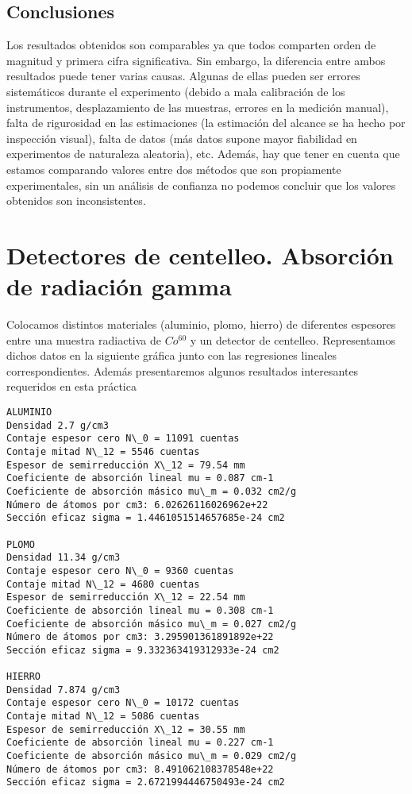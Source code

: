 \documentclass[11pt]{article}
\begin{document}
    

    \hypertarget{conclusiones}{%
\subsection{Conclusiones}\label{conclusiones}}

Los resultados obtenidos son comparables ya que todos comparten orden de
magnitud y primera cifra significativa. Sin embargo, la diferencia entre
ambos resultados puede tener varias causas. Algunas de ellas pueden ser
errores sistemáticos durante el experimento (debido a mala calibración
de los instrumentos, desplazamiento de las muestras, errores en la
medición manual), falta de rigurosidad en las estimaciones (la
estimación del alcance se ha hecho por inspección visual), falta de
datos (más datos supone mayor fiabilidad en experimentos de naturaleza
aleatoria), etc. Además, hay que tener en cuenta que estamos comparando
valores entre dos métodos que son propiamente experimentales, sin un
análisis de confianza no podemos concluir que los valores obtenidos son
inconsistentes.

    \hypertarget{detectores-de-centelleo.-absorciuxf3n-de-radiaciuxf3n-gamma}{%
\section{Detectores de centelleo. Absorción de radiación
gamma}\label{detectores-de-centelleo.-absorciuxf3n-de-radiaciuxf3n-gamma}}

Colocamos distintos materiales (aluminio, plomo, hierro) de diferentes
espesores entre una muestra radiactiva de \(Co^{60}\) y un detector de
centelleo. Representamos dichos datos en la siguiente gráfica junto con
las regresiones lineales correspondientes. Además presentaremos algunos
resultados interesantes requeridos en esta práctica

    \begin{Verbatim}[commandchars=\\\{\}]
ALUMINIO
Densidad 2.7 g/cm3
Contaje espesor cero N\_0 = 11091 cuentas
Contaje mitad N\_12 = 5546 cuentas
Espesor de semirreducción X\_12 = 79.54 mm
Coeficiente de absorción lineal mu = 0.087 cm-1
Coeficiente de absorción másico mu\_m = 0.032 cm2/g
Número de átomos por cm3: 6.02626116026962e+22
Sección eficaz sigma = 1.4461051514657685e-24 cm2

PLOMO
Densidad 11.34 g/cm3
Contaje espesor cero N\_0 = 9360 cuentas
Contaje mitad N\_12 = 4680 cuentas
Espesor de semirreducción X\_12 = 22.54 mm
Coeficiente de absorción lineal mu = 0.308 cm-1
Coeficiente de absorción másico mu\_m = 0.027 cm2/g
Número de átomos por cm3: 3.295901361891892e+22
Sección eficaz sigma = 9.332363419312933e-24 cm2

HIERRO
Densidad 7.874 g/cm3
Contaje espesor cero N\_0 = 10172 cuentas
Contaje mitad N\_12 = 5086 cuentas
Espesor de semirreducción X\_12 = 30.55 mm
Coeficiente de absorción lineal mu = 0.227 cm-1
Coeficiente de absorción másico mu\_m = 0.029 cm2/g
Número de átomos por cm3: 8.491062108378548e+22
Sección eficaz sigma = 2.6721994446750493e-24 cm2

    \end{Verbatim}
\end{document}

